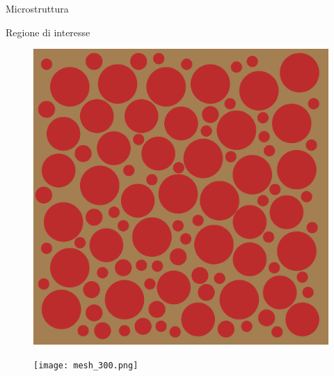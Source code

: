 \documentclass[aspectratio=169,xcolor=dvipsnames]{beamer}
\begin{document}
\begin{frame}{Microstruttura}
\begin{figure}[bt!] %
	
	\centering
	\tiny{	\def\svgwidth{0.40\linewidth}
}
\end{figure}

\end{frame}


\begin{frame}{Regione di interesse}
\begin{figure} 

	\begin{minipage}[c]{0.20\linewidth}
	\includegraphics[width=\linewidth]{mesh_100.png}
\end{minipage} \hspace{0.01\linewidth}
\begin{minipage}[c]{0.20\linewidth}
	\texttt{[image: mesh\_300.png]}
\end{minipage}\hspace{0.01\linewidth}
		\begin{minipage}[c]{0.20\linewidth}

\end{minipage}
\end{figure}
\end{frame}
\end{document}
